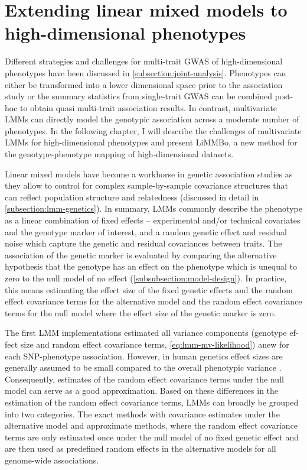 \chapter{Extending linear mixed models to high-dimensional phenotypes}
\label{chapter:limmbo}
Different strategies and challenges for multi-trait GWAS of high-dimensional phenotypes have been discussed in \cref{subsection:joint-analysis}. Phenotypes can either be transformed into a lower dimensional space prior to the association study or the summary statistics from single-trait GWAS can be combined post-hoc to obtain quasi multi-trait association results. In contrast, multivariate LMMs can directly model the genotypic association across a moderate number of phenotypes. In the following chapter, I will describe the challenges of multivariate LMMs for high-dimensional phenotypes and present LiMMBo, a new method for the genotype-phenotype mapping of high-dimensional datasets. 

Linear mixed models have become a workhorse in genetic association studies as they allow to control for complex sample-by-sample covariance structures that can reflect population structure and relatedness (discussed in detail in \cref{subsection:lmm-genetics}). In summary, LMMs commonly describe the phenotype as a linear combination of fixed effects -- experimental and/or technical  covariates and the genotype marker of interest, and a random genetic effect and residual noise which capture the genetic and residual covariances between traits. The association of the genetic marker is evaluated by comparing the alternative hypothesis that the genotype has an effect on the phenotype which is unequal to zero to the null model of no effect (\cref{subsubsection:model-design}). In practice, this means estimating the effect size of the fixed genetic effects and the random effect covariance terms for the alternative model and the random effect covariance terms for the null model where the effect size of the genetic marker is zero. 

The first LMM implementations estimated all variance components (genotype ef- fect size and random effect covariance terms, \cref{eq:lmm-mv-likelihood}) anew for each SNP-phe\-notype association. However, in human genetics effect sizes are generally assumed to be small compared to the overall phenotypic variance \citep{Kang2010,Zhang2010}. Consequently, estimates of the random effect covariance terms under the null model can serve as a good approximation. Based on these differences in the estimation of the random effect covariance terms, LMMs can broadly be grouped into two categories. The exact methods with covariance estimates under the alternative model and approximate methods, where the random effect covariance terms are only estimated once under the null model of no fixed genetic effect and are then used as predefined random effects in the alternative models for all genome-wide associations. 

